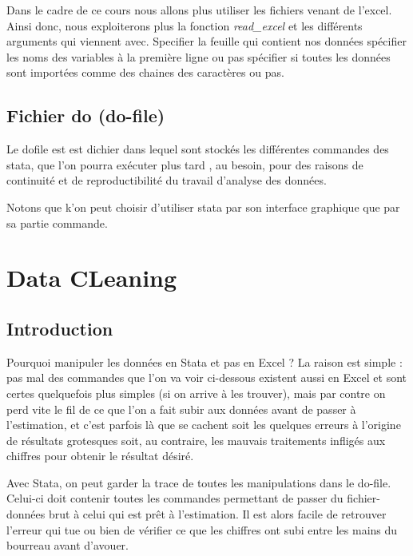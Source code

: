 \documentclass[
]{book}
\begin{document}
Dans le cadre de ce cours nous allons plus utiliser les fichiers venant de l'excel. Ainsi donc, nous exploiterons plus la fonction \emph{read\_excel} et les différents arguments qui viennent avec.
Specifier la feuille qui contient nos données
spécifier les noms des variables à la première ligne ou pas
spécifier si toutes les données sont importées comme des chaines des caractères ou pas.

\hypertarget{fichier-do-do-file}{%
\section{Fichier do (do-file)}\label{fichier-do-do-file}}

Le dofile est est dichier dans lequel sont stockés les différentes commandes des stata, que l'on pourra exécuter plus tard , au besoin, pour des raisons de continuité et de reproductibilité du travail d'analyse des données.

Notons que k'on peut choisir d'utiliser stata par son interface graphique que par sa partie commande.

\hypertarget{data-cleaning}{%
\chapter{Data CLeaning}\label{data-cleaning}}

\hypertarget{introduction}{%
\section{Introduction}\label{introduction}}

Pourquoi manipuler les données en Stata et pas en Excel ? La raison est simple : pas mal des commandes que l'on va voir ci-dessous existent aussi en Excel et sont certes quelquefois plus simples (si on arrive à les trouver), mais par contre on perd vite le fil de ce que l'on a fait subir aux données avant de passer à l'estimation, et c'est parfois là que se cachent soit les quelques erreurs à l'origine de résultats grotesques soit, au contraire, les mauvais traitements infligés aux chiffres pour obtenir le résultat désiré.

Avec Stata, on peut garder la trace de toutes les manipulations dans le do-file. Celui-ci doit contenir toutes les commandes permettant de passer du fichier-données brut à celui qui est prêt à l'estimation. Il est alors facile de retrouver l'erreur qui tue ou bien de vérifier ce que les chiffres ont subi entre les mains du bourreau avant d'avouer.
\end{document}
